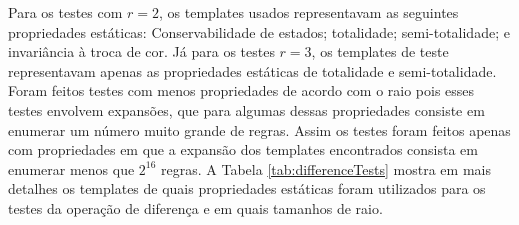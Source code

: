 Para os testes com $r = 2$, os templates usados representavam as seguintes propriedades estáticas: Conservabilidade de estados; totalidade; semi-totalidade; e invariância à troca de cor. Já para os testes $r = 3$, os templates de teste representavam apenas as propriedades estáticas de totalidade e semi-totalidade. Foram feitos testes com menos propriedades de acordo com o raio pois esses testes envolvem expansões, que para algumas dessas propriedades consiste em enumerar um número muito grande de regras. Assim os testes foram feitos apenas com propriedades em que a expansão dos templates encontrados consista em enumerar menos que $2^{16}$ regras. A Tabela \ref{tab:differenceTests} mostra em mais detalhes os templates de quais propriedades estáticas foram utilizados para os testes da operação de diferença e em quais tamanhos de raio.

\begin{table}[h!]
\centering
\caption{Propriedades estáticas utilizadas para o teste da operação de diferença em cada raio}
\label{tab:differenceTests}
\end{table}


